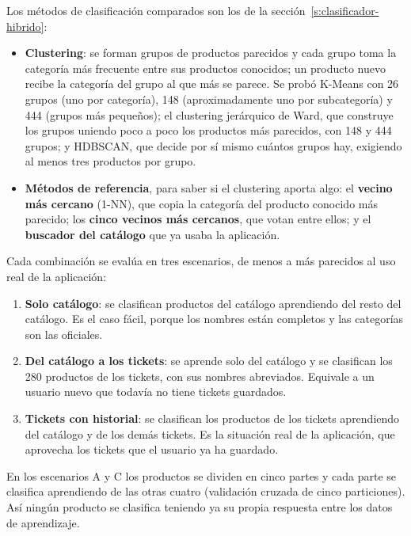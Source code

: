 Los métodos de clasificación comparados son los de la sección~\ref{s:clasificador-hibrido}:

\begin{itemize}
    \item \textbf{Clustering}: se forman grupos de productos parecidos y cada grupo toma la categoría más frecuente entre sus productos conocidos; un producto nuevo recibe la categoría del grupo al que más se parece. Se probó K-Means con 26 grupos (uno por categoría), 148 (aproximadamente uno por subcategoría) y 444 (grupos más pequeños); el clustering jerárquico de Ward, que construye los grupos uniendo poco a poco los productos más parecidos, con 148 y 444 grupos; y HDBSCAN, que decide por sí mismo cuántos grupos hay, exigiendo al menos tres productos por grupo.
    \item \textbf{Métodos de referencia}, para saber si el clustering aporta algo: el \textbf{vecino más cercano} (1-NN), que copia la categoría del producto conocido más parecido; los \textbf{cinco vecinos más cercanos}, que votan entre ellos; y el \textbf{buscador del catálogo} que ya usaba la aplicación.
\end{itemize}

Cada combinación se evalúa en tres escenarios, de menos a más parecidos al uso real de la aplicación:

\begin{enumerate}
    \item[A.] \textbf{Solo catálogo}: se clasifican productos del catálogo aprendiendo del resto del catálogo. Es el caso fácil, porque los nombres están completos y las categorías son las oficiales.
    \item[B.] \textbf{Del catálogo a los tickets}: se aprende solo del catálogo y se clasifican los 280 productos de los tickets, con sus nombres abreviados. Equivale a un usuario nuevo que todavía no tiene tickets guardados.
    \item[C.] \textbf{Tickets con historial}: se clasifican los productos de los tickets aprendiendo del catálogo y de los demás tickets. Es la situación real de la aplicación, que aprovecha los tickets que el usuario ya ha guardado.
\end{enumerate}

En los escenarios A y C los productos se dividen en cinco partes y cada parte se clasifica aprendiendo de las otras cuatro (validación cruzada de cinco particiones). Así ningún producto se clasifica teniendo ya su propia respuesta entre los datos de aprendizaje.

